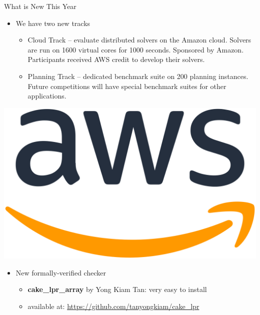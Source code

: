 \documentclass{beamer}
\begin{document}
\begin{frame}{What is New This Year}

\begin{minipage}{.7\textwidth}
\begin{itemize}
  \item We have two new tracks
  \begin{itemize}
  \item Cloud Track -- evaluate distributed solvers on the Amazon cloud. Solvers are run on 1600 virtual cores for 1000 seconds. 
  Sponsored by Amazon. Participants received AWS credit to develop their solvers.
  \item Planning Track -- dedicated benchmark suite on 200 planning instances. Future competitions will have special benchmark suites for other applications.
  \end{itemize}
\end{itemize}
\end{minipage}
\begin{minipage}{.28\textwidth}
\centering
\includegraphics[width=.9\textwidth]{AWSlogo}
\end{minipage}

\medskip

\begin{itemize}
  \item New formally-verified checker
  \begin{itemize}
	\item {\bf cake\_lpr\_array} by Yong Kiam Tan: very easy to install
	\item available at: \url{https://github.com/tanyongkiam/cake_lpr}
  \end{itemize}
\end{itemize}
\end{frame}
\end{document}
